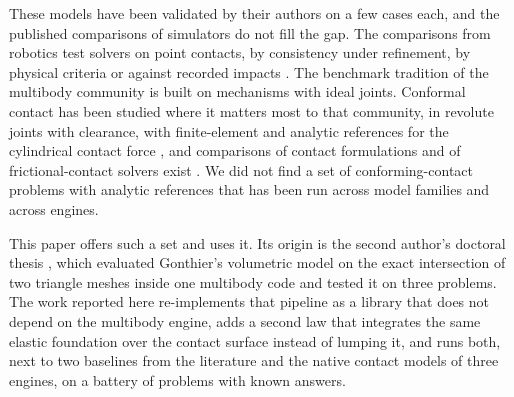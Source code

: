 These models have been validated by their authors on a few cases each, and the published
comparisons of simulators do not fill the gap. The comparisons from robotics test solvers on
point contacts, by consistency under refinement, by physical criteria or against recorded
impacts \cite{Erez2015,Horak2019,Acosta2022,LeLidec2024}. The benchmark tradition of the
multibody community \cite{Gonzalez2006,Gonzalez2010,IFToMMBenchmark} is built on mechanisms with
ideal joints. Conformal contact has been studied where it matters most to that community, in
revolute joints with clearance, with finite-element and analytic references for the cylindrical
contact force \cite{Liu2007,Pereira2011,Pereira2015}, and comparisons of contact formulations
and of frictional-contact solvers exist \cite{Drumwright2011,Acary2018}. We did not find a set of
conforming-contact problems with analytic references that has been run across model families
and across engines.

This paper offers such a set and uses it. Its origin is the second author's doctoral thesis
\cite{Vilela2018}, which evaluated Gonthier's volumetric model on the exact intersection of two
triangle meshes inside one multibody code and tested it on three problems. The work reported
here re-implements that pipeline as a library that does not depend on the multibody engine,
adds a second law that integrates the same elastic foundation over the contact surface instead
of lumping it, and runs both, next to two baselines from the literature and the native contact
models of three engines, on a battery of problems with known answers.

